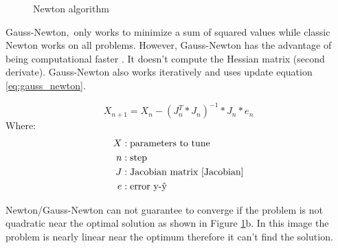 \documentclass[11pt,a4paper,titlepage,oneside]{report}
\begin{document}
\begin{figure}[H]
	\centering
	\qquad
	\caption{Newton algorithm}
	\label{fig:newton}
\end{figure}

Gauss-Newton, only works to minimize a sum of squared values while classic Newton works on all problems. However, Gauss-Newton has the advantage of being computational faster \cite{gauss_newton}. It doesn't compute the Hessian matrix (second derivate). Gauss-Newton also works iteratively and uses update equation \ref{eq:gauss_newton}. 

\begin{equation}\label{eq:gauss_newton}
  X_{n+1} = X_n - (J_n^T*J_n)^{-1}*J_n*e_n
\end{equation}
Where:
\begin{align*}
  X		  &: \text{parameters to tune}\\
  n		  &: \text{step}\\
	J		  &: \text{Jacobian matrix \cite{Jacobian}}\\
  e  	  &: \text{error y-ŷ}
\end{align*}

Newton/Gauss-Newton can not guarantee to converge if the problem is not quadratic near the optimal solution as shown in Figure \ref{fig:newton}b. In this image the problem is nearly linear near the optimum therefore it can't find the solution.
\end{document}
